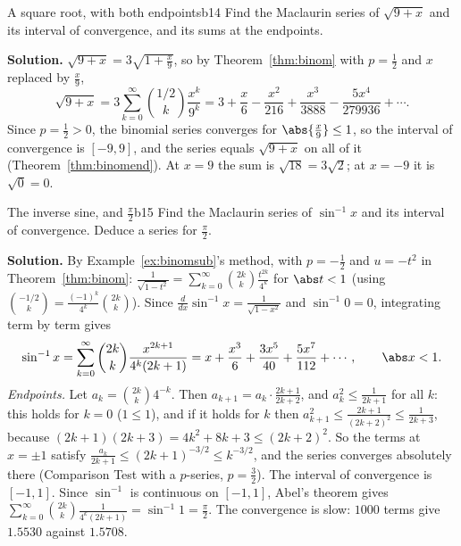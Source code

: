 \documentclass[11pt]{article}
\begin{document}
\begin{exmp}{A square root, with both endpoints}{b14}
Find the Maclaurin series of $\sqrt{9+x}$ and its interval of convergence, and its sums at the endpoints.

\textbf{Solution.} $\sqrt{9+x}=3\sqrt{1+\frac x9}$, so by Theorem~\ref{thm:binom} with $p=\frac12$ and $x$ replaced by $\frac x9$,
\[
\sqrt{9+x}=3\sum_{k=0}^\infty\binom{1/2}k\frac{x^k}{9^k}=3+\frac x6-\frac{x^2}{216}+\frac{x^3}{3888}-\frac{5x^4}{279936}+\cdots .
\]
Since $p=\frac12>0$, the binomial series converges for $\abs{\frac x9}\le1$, so the interval of convergence is $[-9,9]$, and the series equals $\sqrt{9+x}$ on all of it (Theorem~\ref{thm:binomend}). At $x=9$ the sum is $\sqrt{18}=3\sqrt2$; at $x=-9$ it is $\sqrt0=0$.
\end{exmp}

\begin{exmp}{The inverse sine, and $\frac\pi2$}{b15}
Find the Maclaurin series of $\sin^{-1}x$ and its interval of convergence. Deduce a series for $\frac\pi2$.

\textbf{Solution.} By Example~\ref{ex:binomsub}'s method, with $p=-\frac12$ and $u=-t^2$ in Theorem~\ref{thm:binom}: $\frac1{\sqrt{1-t^2}}=\sum_{k=0}^\infty\binom{2k}k\frac{t^{2k}}{4^k}$ for $\abs t<1$ (using $\binom{-1/2}k=\frac{(-1)^k}{4^k}\binom{2k}k$). Since $\frac d{dx}\sin^{-1}x=\frac1{\sqrt{1-x^2}}$ and $\sin^{-1}0=0$, integrating term by term gives
\[
\sin^{-1}x=\sum_{k=0}^\infty\binom{2k}k\frac{x^{2k+1}}{4^k(2k+1)}=x+\frac{x^3}6+\frac{3x^5}{40}+\frac{5x^7}{112}+\cdots,\qquad\abs x<1 .
\]
\emph{Endpoints.} Let $a_k=\binom{2k}k4^{-k}$. Then $a_{k+1}=a_k\cdot\frac{2k+1}{2k+2}$, and $a_k^2\le\frac1{2k+1}$ for all $k$: this holds for $k=0$ ($1\le1$), and if it holds for $k$ then $a_{k+1}^2\le\frac{2k+1}{(2k+2)^2}\le\frac1{2k+3}$, because $(2k+1)(2k+3)=4k^2+8k+3\le(2k+2)^2$. So the terms at $x=\pm1$ satisfy $\frac{a_k}{2k+1}\le(2k+1)^{-3/2}\le k^{-3/2}$, and the series converges absolutely there (Comparison Test with a $p$-series, $p=\frac32$). The interval of convergence is $[-1,1]$. Since $\sin^{-1}$ is continuous on $[-1,1]$, Abel's theorem gives $\sum_{k=0}^\infty\binom{2k}k\frac1{4^k(2k+1)}=\sin^{-1}1=\frac\pi2$. The convergence is slow: $1000$ terms give $1.5530$ against $1.5708$.
\end{exmp}
\end{document}
